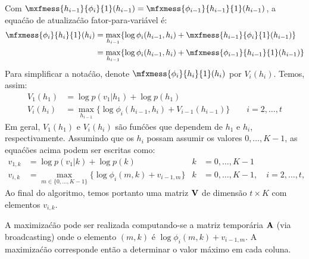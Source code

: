 \begin{solution}
\begin{center}
{}
    \end{center}
    
    Com $\mxfmess{h_{i-1}}{\phi_i}{1}(h_{i-1})=\mfxmess{\phi_{i-1}}{h_{i-1}}{1}(h_{i-1})$, a equa\'c\~ao de atualiza\'c\~ao fator-para-vari\'avel \'e:
    \begin{align}
        \mfxmess{\phi_i}{h_i}{1}(h_i) &= \max_{h_{i-1}} \{ \log \phi_i(h_{i-1}, h_i) + \mxfmess{h_{i-1}}{\phi_i}{1}(h_{i-1}) \}\\
        &= \max_{h_{i-1}} \{ \log \phi_i(h_{i-1}, h_i) + \mfxmess{\phi_{i-1}}{h_{i-1}}{1}(h_{i-1}) \}
    \end{align}
    Para simplificar a nota\'c\~ao, denote $\mfxmess{\phi_i}{h_i}{1}(h_i)$ por $V_i(h_i)$. Temos, assim:
    \begin{align}
        V_1(h_1) & = \log p(v_1|h_1) + \log p(h_1) \\
        V_i(h_i) & =  \max_{h_{i-1}} \{ \log \phi_i(h_{i-1}, h_i) + V_{i-1}(h_{i-1}) \} \quad \quad i=2, \ldots, t
    \end{align}
    Em geral, $V_1(h_1)$ e $V_i(h_i)$ s\~ao fun\'c\~oes que dependem de
    $h_1$ e $h_i$, respectivamente. Assumindo que os $h_i$ possam assumir
    os valores $0, \ldots, K-1$, as equa\'c\~oes acima podem ser escritas como:
    \begin{align}
        v_{1,k} &= \log p(v_1|k) + \log p(k) &  k&=0, \ldots, K-1\\
        v_{i,k} & =  \max_{m \in \{0, \ldots, K-1\}} \{ \log \phi_i(m, k) + v_{i-1,m} \} &  k&=0, \ldots, K-1, \quad i=2, \ldots, t,
    \end{align}
    Ao final do algoritmo, temos portanto uma matriz $\mathbf{V}$ de dimens\~ao $t \times K$
    com elementos $v_{i,k}$.
    
    A maximiza\'c\~ao pode ser realizada computando-se a matriz tempor\'aria
    $\mathbf{A}$ (via broadcasting) onde o elemento $(m,k)$ \'e $\log
    \phi_i(m, k) + v_{i-1,m}$. A maximiza\'c\~ao corresponde ent\~ao a
    determinar o valor m\'aximo em cada coluna.
    

\end{solution}
